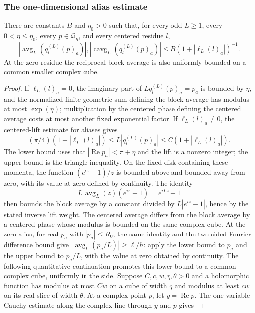 \subsubsection{The one-dimensional alias estimate}

\begin{lemma}
\label{lem:ex-lattice-rail-alias-decay}
There are constants $B$ and $\eta_0>0$ such that, for every odd $L\geq1$,
every $0<\eta\leq\eta_0$, every $p\in\mathcal Q_\eta$, and every
centered residue $l$,
\[
 |\operatorname{avg}_L(q_l^{(L)}(p)_a)|,
   |\operatorname{cavg}_L(q_l^{(L)}(p)_a)|
 \leq B(1+|\ell_L(l)_a|)^{-1}.
\]
At the zero residue the reciprocal block average is also uniformly bounded on a
common smaller complex cube.
\end{lemma}

\begin{proof}
If $\ell_L(l)_a=0$, the imaginary part of $Lq_l^{(L)}(p)_a=p_a$ is bounded by
$\eta$, and the normalized finite geometric sum defining the block average has
modulus at most $\exp(\eta)$; multiplication by the centered phase defining
the centered average costs at most another fixed exponential factor. If
$\ell_L(l)_a\ne0$, the centered-lift estimate for aliases gives
\[
 (\pi/4)(1+|\ell_L(l)_a|)\leq
 L|q_l^{(L)}(p)_a|\leq C(1+|\ell_L(l)_a|).
\]
The lower bound uses that $|\operatorname{Re}p_a|<\pi+\eta$ and the lift is
a nonzero integer; the upper bound is the triangle inequality. On the fixed
disk containing these momenta, the function
$(e^{iz}-1)/z$ is bounded above and bounded away from zero, with its value at
zero defined by continuity. The identity
\[
 L\,\operatorname{avg}_L(z)(e^{iz}-1)=e^{iLz}-1
\]
then bounds the block average by a constant divided by
$L|e^{iz}-1|$, hence by the stated inverse lift weight. The centered average differs
from the block average by a centered phase whose modulus is bounded on the same
complex cube. At the zero alias, for real $p_a$ with $|p_a|\leq R_0$, the same
identity and the two-sided Fourier difference bound give
$|\operatorname{avg}_L(p_a/L)|\geq\ell/h$: apply the lower bound to
$p_a$ and the upper bound to $p_a/L$, with the value at zero obtained by
continuity. The following quantitative continuation promotes this lower
bound to a common complex cube, uniformly in the side.
Suppose $C,c,w,\eta,\theta>0$ and a holomorphic function has modulus at
most $Cw$ on a cube of width $\eta$ and modulus at least $cw$ on its real
slice of width $\theta$. At a complex point $p$, let $y=\operatorname{Re}p$. The
one-variable Cauchy estimate along the complex line through $y$ and $p$ gives

\end{proof}
